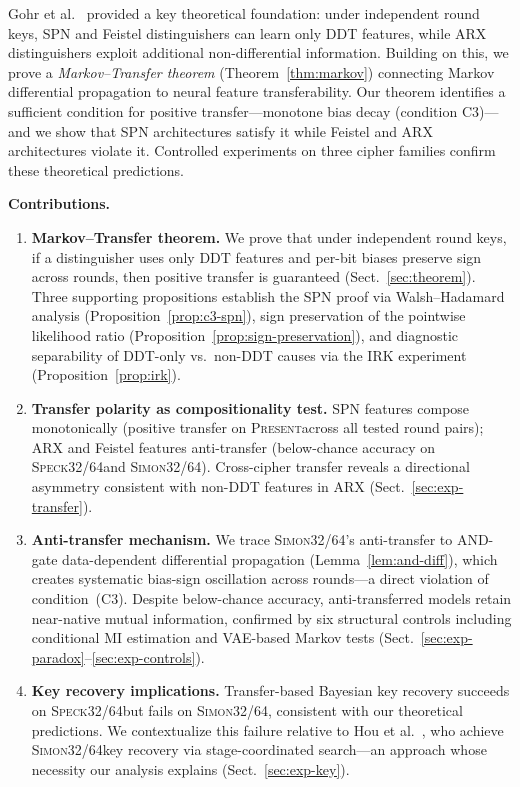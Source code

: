 \documentclass[runningheads]{llncs}
\newcommand{\speck}{\textsc{Speck32/64}}
\newcommand{\simon}{\textsc{Simon32/64}}
\newcommand{\present}{\textsc{Present}}
\begin{document}
Gohr et al.~\cite{gohr2022assessment} provided a key theoretical foundation: under independent round keys, SPN and Feistel distinguishers can learn only DDT features, while ARX distinguishers exploit additional non-differential information.
Building on this, we prove a \emph{Markov--Transfer theorem} (Theorem~\ref{thm:markov}) connecting Markov differential propagation to neural feature transferability.
Our theorem identifies a sufficient condition for positive transfer---monotone bias decay (condition C3)---and we show that SPN architectures satisfy it while Feistel and ARX architectures violate it.
Controlled experiments on three cipher families confirm these theoretical predictions.

\smallskip\noindent\textbf{Contributions.}
\begin{enumerate}[leftmargin=*,itemsep=1pt,topsep=2pt]
  \item \textbf{Markov--Transfer theorem.}
  We prove that under independent round keys, if a distinguisher uses only DDT features and per-bit biases preserve sign across rounds, then positive transfer is guaranteed (Sect.~\ref{sec:theorem}).
  Three supporting propositions establish the SPN proof via Walsh--Hadamard analysis (Proposition~\ref{prop:c3-spn}), sign preservation of the pointwise likelihood ratio (Proposition~\ref{prop:sign-preservation}), and diagnostic separability of DDT-only vs.\ non-DDT causes via the IRK experiment (Proposition~\ref{prop:irk}).

  \item \textbf{Transfer polarity as compositionality test.}
  SPN features compose monotonically (positive transfer on \present across all tested round pairs); ARX and Feistel features anti-transfer (below-chance accuracy on \speck and \simon).
  Cross-cipher transfer reveals a directional asymmetry consistent with non-DDT features in ARX (Sect.~\ref{sec:exp-transfer}).

  \item \textbf{Anti-transfer mechanism.}
  We trace \simon's anti-transfer to AND-gate data-dependent differential propagation (Lemma~\ref{lem:and-diff}), which creates systematic bias-sign oscillation across rounds---a direct violation of condition~(C3).
  Despite below-chance accuracy, anti-transferred models retain near-native mutual information, confirmed by six structural controls including conditional MI estimation and VAE-based Markov tests (Sect.~\ref{sec:exp-paradox}--\ref{sec:exp-controls}).

  \item \textbf{Key recovery implications.}
  Transfer-based Bayesian key recovery succeeds on \speck but fails on \simon, consistent with our theoretical predictions.
  We contextualize this failure relative to Hou et al.~\cite{hou2025bayesian}, who achieve \simon key recovery via stage-coordinated search---an approach whose necessity our analysis explains (Sect.~\ref{sec:exp-key}).
\end{enumerate}
\end{document}

